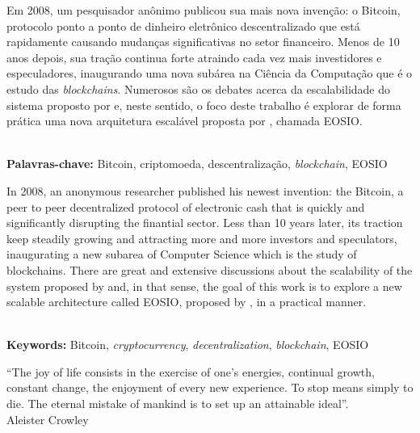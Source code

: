 \documentclass[a4paper,12pt]{monografia}
\theoremstyle{plain}
\theoremstyle{definition}
\theoremstyle{remark}
\begin{document}



Em 2008, um pesquisador an\^onimo publicou sua mais nova inven\c{c}\~ao: o Bitcoin, protocolo ponto a ponto de dinheiro eletr\^onico descentralizado que est\'a rapidamente causando mudan\c{c}as significativas no setor financeiro.
Menos de 10 anos depois, sua tra\c{c}\~ao continua forte atraindo cada vez mais investidores e especuladores, inaugurando uma nova sub\'area na Ci\^encia da Computa\c{c}\~ao que \'e o estudo das \textit{blockchains}.
Numerosos s\~{a}o os debates acerca da escalabilidade do sistema proposto por  e, neste sentido, o foco deste trabalho \'e explorar de forma pr\'atica uma nova arquitetura escal\'{a}vel proposta por , chamada EOSIO.

\noindent \\ \textbf{Palavras-chave:} Bitcoin, criptomoeda, descentraliza\c{c}\~ao, \textit{blockchain}, EOSIO

In 2008, an anonymous researcher published his newest invention: the Bitcoin, a peer to peer decentralized protocol of electronic cash that is quickly and significantly disrupting the finantial sector.
Less than 10 years later, its traction keep steadily growing and attracting more and more investors and speculators, inaugurating a new subarea of Computer Science which is the study of blockchains.
There are great and extensive discussions about the scalability of the system proposed by  and, in that sense, the goal of this work is to explore a new scalable architecture called EOSIO, proposed by , in a practical manner.

\noindent \\ \textbf{Keywords:} Bitcoin, \textit{cryptocurrency}, \textit{decentralization}, \textit{blockchain}, EOSIO


\newpage

\begin{epigrafe}
``The joy of life consists in the exercise of one’s energies, continual growth, constant change, the enjoyment of every new experience. To stop means simply to die. The eternal mistake of mankind is to set up an attainable ideal''.\\
\hfill Aleister Crowley
\end{epigrafe}
\end{document}
